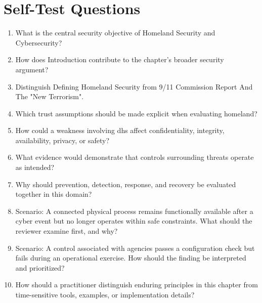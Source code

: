 \documentclass[11pt]{article}
\begin{document}
\section*{Self-Test Questions}
\begin{enumerate}
\item What is the central security objective of Homeland Security and Cybersecurity?
\item How does Introduction contribute to the chapter's broader security argument?
\item Distinguish Defining Homeland Security from 9/11 Commission Report And The "New Terrorism".
\item Which trust assumptions should be made explicit when evaluating homeland?
\item How could a weakness involving dhs affect confidentiality, integrity, availability, privacy, or safety?
\item What evidence would demonstrate that controls surrounding threats operate as intended?
\item Why should prevention, detection, response, and recovery be evaluated together in this domain?
\item Scenario: A connected physical process remains functionally available after a cyber event but no longer operates within safe constraints. What should the reviewer examine first, and why?
\item Scenario: A control associated with agencies passes a configuration check but fails during an operational exercise. How should the finding be interpreted and prioritized?
\item How should a practitioner distinguish enduring principles in this chapter from time-sensitive tools, examples, or implementation details?
\end{enumerate}
\end{document}
